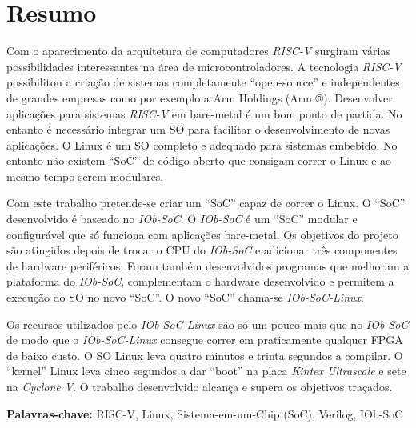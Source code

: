 \cleardoubleoddpage

\chapter*{Resumo}
\thispagestyle{empty} %

Com o aparecimento da arquitetura de computadores \textit{RISC-V} surgiram várias possibilidades interessantes na área de microcontroladores. A tecnologia \textit{RISC-V} possibilitou a criação de sistemas completamente “open-source” e independentes de grandes empresas como por exemplo a Arm Holdings (Arm ®). Desenvolver aplicações para sistemas \textit{RISC-V} em bare-metal é um bom ponto de partida. No entanto é necessário integrar um SO para facilitar o desenvolvimento de novas aplicações. O Linux é um SO completo e adequado para sistemas embebido. No entanto não existem “SoC” de código aberto que consigam correr o Linux e ao mesmo tempo serem modulares. 

Com este trabalho pretende-se criar um “SoC” capaz de correr o Linux. O “SoC” desenvolvido é baseado no \textit{IOb-SoC}. O \textit{IOb-SoC} é um “SoC” modular e configurável que só funciona com aplicações bare-metal. Os objetivos do projeto são atingidos depois de trocar o CPU do \textit{IOb-SoC} e adicionar três componentes de hardware periféricos. Foram também desenvolvidos programas que melhoram a plataforma do \textit{IOb-SoC}, complementam o hardware desenvolvido e permitem a execução do SO no novo “SoC”. O novo “SoC” chama-se \textit{IOb-SoC-Linux}. 

Os recursos utilizados pelo \textit{IOb-SoC-Linux} são só um pouco mais que no \textit{IOb-SoC} de modo que o \textit{IOb-SoC-Linux} consegue correr em praticamente qualquer FPGA de baixo custo. O SO Linux leva quatro minutos e trinta segundos a compilar. O “kernel” Linux leva cinco segundos a dar “boot” na placa \textit{Kintex Ultrascale} e sete na \textit{Cyclone V}. O trabalho desenvolvido alcança e supera os objetivos traçados. 

\vfill

\textbf{\Large Palavras-chave:} RISC-V, Linux, Sistema-em-um-Chip (SoC), Verilog, IOb-SoC

